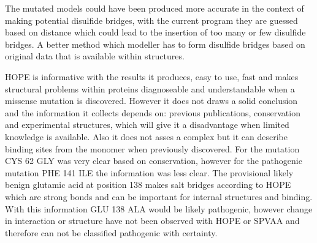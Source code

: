 The mutated models could have been produced more accurate in the context of making potential disulfide bridges, with the current program they are guessed based on distance which could lead to the insertion of too many or few disulfide bridges. A better method which modeller has to form disulfide bridges based on original data that is available within structures. 

HOPE is informative with the results it produces, easy to use, fast and makes structural problems within proteins diagnoseable and understandable when a missense mutation is discovered. However it does not draws a solid conclusion and the information it collects depends on: previous publications, conservation and experimental structures, which will give it a disadvantage when limited knowledge is available. Also it does not asses a complex but it can describe binding sites from the monomer when previously discovered. For the mutation CYS 62 GLY was very clear based on conservation, however for the pathogenic mutation PHE 141 ILE the information was less clear. The provisional likely benign glutamic acid at position 138 makes salt bridges according to HOPE which are strong bonds and can be important for internal structures and binding. With this information GLU 138 ALA would be likely pathogenic, however change in interaction or structure have not been observed with HOPE or SPVAA and therefore can not be classified pathogenic with certainty.

